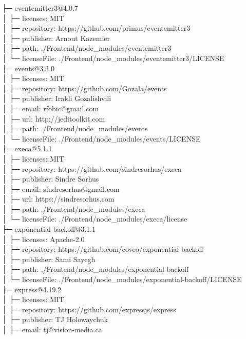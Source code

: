 ├─ eventemitter3@4.0.7\\
│  ├─ licenses: MIT\\
│  ├─ repository: https://github.com/primus/eventemitter3\\
│  ├─ publisher: Arnout Kazemier\\
│  ├─ path: ./Frontend/node\_modules/eventemitter3\\
│  └─ licenseFile: ./Frontend/node\_modules/eventemitter3/LICENSE\\
├─ events@3.3.0\\
│  ├─ licenses: MIT\\
│  ├─ repository: https://github.com/Gozala/events\\
│  ├─ publisher: Irakli Gozalishvili\\
│  ├─ email: rfobic@gmail.com\\
│  ├─ url: http://jeditoolkit.com\\
│  ├─ path: ./Frontend/node\_modules/events\\
│  └─ licenseFile: ./Frontend/node\_modules/events/LICENSE\\
├─ execa@5.1.1\\
│  ├─ licenses: MIT\\
│  ├─ repository: https://github.com/sindresorhus/execa\\
│  ├─ publisher: Sindre Sorhus\\
│  ├─ email: sindresorhus@gmail.com\\
│  ├─ url: https://sindresorhus.com\\
│  ├─ path: ./Frontend/node\_modules/execa\\
│  └─ licenseFile: ./Frontend/node\_modules/execa/license\\
├─ exponential-backoff@3.1.1\\
│  ├─ licenses: Apache-2.0\\
│  ├─ repository: https://github.com/coveo/exponential-backoff\\
│  ├─ publisher: Sami Sayegh\\
│  ├─ path: ./Frontend/node\_modules/exponential-backoff\\
│  └─ licenseFile: ./Frontend/node\_modules/exponential-backoff/LICENSE\\
├─ express@4.19.2\\
│  ├─ licenses: MIT\\
│  ├─ repository: https://github.com/expressjs/express\\
│  ├─ publisher: TJ Holowaychuk\\
│  ├─ email: tj@vision-media.ca\\
